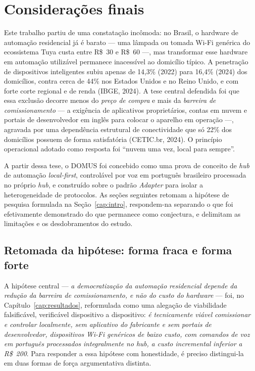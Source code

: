 \section{Considerações finais}\label{cap:consideracoes}

Este trabalho partiu de uma constatação incômoda: no Brasil, o hardware de automação
residencial já é barato --- uma lâmpada ou tomada Wi-Fi genérica do ecossistema Tuya
custa entre R\$~30 e R\$~60 ---, mas transformar esse hardware em automação utilizável
permanece inacessível ao domicílio típico. A penetração de dispositivos inteligentes
subiu apenas de 14,3\% (2022) para 16,4\% (2024) dos domicílios, contra cerca de 44\%
nos Estados Unidos e no Reino Unido, e com forte corte regional e de renda (IBGE, 2024).
A tese central defendida foi que essa exclusão decorre menos do \emph{preço de compra}
e mais da \emph{barreira de comissionamento} --- a exigência de aplicativos
proprietários, contas em nuvem e portais de desenvolvedor em inglês para colocar o
aparelho em operação ---, agravada por uma dependência estrutural de conectividade que
só 22\% dos domicílios possuem de forma satisfatória (CETIC.br, 2024). O princípio
operacional adotado como resposta foi ``nuvem uma vez, local para sempre''.

A partir dessa tese, o DOMUS foi concebido como uma prova de conceito de \textit{hub}
de automação \textit{local-first}, controlável por voz em português brasileiro
processada no próprio \textit{hub}, e construído sobre o padrão \textit{Adapter} para
isolar a heterogeneidade de protocolos. As seções seguintes retomam a hipótese de
pesquisa formulada na Seção~\ref{cap:intro}, respondem-na separando o que foi
efetivamente demonstrado do que permanece como conjectura, e delimitam as limitações e
os desdobramentos do estudo.

\subsection{Retomada da hipótese: forma fraca e forma forte}

A hipótese central --- \emph{a democratização da automação residencial depende da
redução da barreira de comissionamento, e não do custo do hardware} --- foi, no
Capítulo~\ref{cap:resultados}, reformulada como uma alegação de viabilidade
falsificável, verificável dispositivo a dispositivo: \emph{é tecnicamente viável
comissionar e controlar localmente, sem aplicativo do fabricante e sem portais de
desenvolvedor, dispositivos Wi-Fi genéricos de baixo custo, com comandos de voz em
português processados integralmente no \textit{hub}, a custo incremental inferior a
R\$~200}. Para responder a essa hipótese com honestidade, é preciso distingui-la em
duas formas de força argumentativa distinta.

